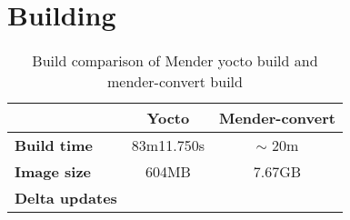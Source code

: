 \documentclass[../../main.tex]{subfiles}
\begin{document}
\section{Building}%
\label{sec:building}

\begin{table}[h]
	\centering
	\caption{Build comparison of Mender yocto build and mender-convert build}
	\label{tab:build_comp}
	\begin{tabular}{l|cc}
		& \textbf{Yocto} & \textbf{Mender-convert}\\
		\hline
		\textbf{Build time}&83m11.750s& $\sim$ 20m \\
		\textbf{Image size}&604MB&7.67GB\\
		\textbf{Delta updates}&&
	\end{tabular}
\end{table}
\end{document}
